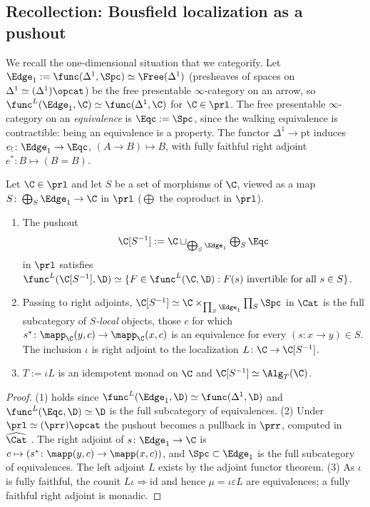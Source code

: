\subsection{Recollection: Bousfield localization as a pushout}
\label{subsec:2dloc-bousfield}

We recall the one-dimensional situation that we categorify.
Let $\Edge_{1} := \func(\Delta^{1},\Spc) \simeq \Free(\Delta^{1})$ (presheaves of spaces on $\Delta^{1} \simeq (\Delta^{1})\opcat$) be the free presentable $\infty$-category on an arrow, so $\func^{L}(\Edge_{1},\C) \simeq \func(\Delta^{1},\C)$ for $\C \in \prl$. The free presentable $\infty$-category on an \emph{equivalence} is $\Eqc := \Spc$, since the walking equivalence is contractible: being an equivalence is a property.
The functor $\Delta^{1} \to \mathrm{pt}$ induces $e_{!}\colon \Edge_{1} \to \Eqc$, $(A \to B) \mapsto B$, with fully faithful right adjoint $e^{*}\colon B \mapsto (B = B)$.

\begin{prop}
\label{prop:bousfield-pushout}
Let $\C \in \prl$ and let $S$ be a set of morphisms of $\C$, viewed as a map $S\colon \bigoplus_{S}\Edge_{1} \to \C$ in $\prl$ ($\bigoplus$ the coproduct in $\prl$).
\begin{enumerate}
\item The pushout
\[
\C[S^{-1}] := \C \sqcup_{\bigoplus_{S}\Edge_{1}} \textstyle\bigoplus_{S}\Eqc
\]
in $\prl$ satisfies $\func^{L}(\C[S^{-1}],\D) \simeq \{F \in \func^{L}(\C,\D) : F(s) \text{ invertible for all } s \in S\}$.
\item Passing to right adjoints, $\C[S^{-1}] \simeq \C \times_{\prod_{S}\Edge_{1}} \prod_{S}\Spc$ in $\Cat$ is the full subcategory of \emph{$S$-local} objects, those $c$ for which $s^{*}\colon \mapp_{\C}(y,c) \to \mapp_{\C}(x,c)$ is an equivalence for every $(s\colon x \to y) \in S$. The inclusion $\iota$ is right adjoint to the localization $L\colon \C \to \C[S^{-1}]$.
\item $T := \iota L$ is an idempotent monad on $\C$ and $\C[S^{-1}] \simeq \Alg_{T}(\C)$.
\end{enumerate}
\end{prop}

\begin{proof}
(1) holds since $\func^{L}(\Edge_{1},\D) \simeq \func(\Delta^{1},\D)$ and $\func^{L}(\Eqc,\D) \simeq \D$ is the full subcategory of equivalences.
(2) Under $\prl \simeq (\prr)\opcat$ \cite[5.5.3.4]{htt} the pushout becomes a pullback in $\prr$, computed in $\widehat{\Cat}$ \cite[5.5.3.18]{htt}. The right adjoint of $s\colon \Edge_{1} \to \C$ is $c \mapsto (s^{*}\colon \mapp(y,c) \to \mapp(x,c))$, and $\Spc \subset \Edge_{1}$ is the full subcategory of equivalences. The left adjoint $L$ exists by the adjoint functor theorem.
(3) As $\iota$ is fully faithful, the counit $L\iota \Rightarrow \mathrm{id}$ and hence $\mu = \iota\varepsilon L$ are equivalences; a fully faithful right adjoint is monadic.
\end{proof}

